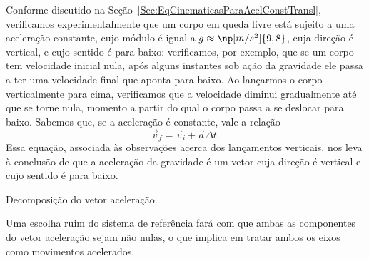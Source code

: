 Conforme discutido na Seção~\ref{Sec:EqCinematicasParaAcelConstTransl}, verificamos experimentalmente que um corpo em queda livre está sujeito a uma aceleração constante, cujo módulo é igual a $g \approx \np[m/s^2]{9,8}$, cuja direção é vertical, e cujo sentido é para baixo: verificamos, por exemplo, que se um corpo tem velocidade inicial nula, após alguns instantes sob ação da gravidade ele passa a ter uma velocidade final que aponta para baixo. Ao lançarmos o corpo verticalmente para cima, verificamos que a velocidade diminui gradualmente até que se torne nula, momento a partir do qual o corpo passa a se deslocar para baixo. Sabemos que, se a aceleração é constante, vale a relação
\begin{equation}
    \vec{v}_f = \vec{v}_i + \vec{a} \Delta t.
\end{equation}
%
Essa equação, associada às observações acerca dos lançamentos verticais, nos leva à conclusão de que a aceleração da gravidade é um vetor cuja direção é vertical e cujo sentido é para baixo.

\begin{marginfigure}
\centering
{}
\caption{Decomposição do vetor aceleração.}
\end{marginfigure}

\begin{marginfigure}
\centering
{}
\caption{Uma escolha ruim do sistema de referência fará com que ambas as componentes do vetor aceleração sejam não nulas, o que implica em tratar ambos os eixos como movimentos acelerados.}
\end{marginfigure}

